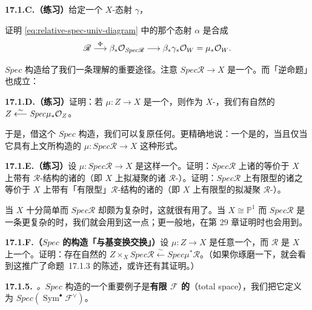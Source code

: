 \textbf{17.1.C.（练习）}\quad 给定一个 $X$-态射 $\gamma$，
证明 \eqref{eq:relative-spec-univ-diagram} 中的那个态射 $\alpha$ 是合成
\[
\mathscr{R}\overset{\Phi}{\longrightarrow}\beta_*\mathcal{O}_{\mathit{Spec}\mathscr{R}}\longrightarrow\beta_*\gamma_*\mathcal{O}_W=\mu_*\mathcal{O}_W.
\]

$\mathit{Spec}$ 构造给了我们一条理解\trAffine\trMorphism{}的重要途径。注意 $\mathit{Spec}\mathscr{R}\to X$ 是一个\trAffine\trMorphism。而「逆命题」也成立：

\textbf{17.1.D.（练习）}\quad 证明：若 $\mu\colon Z\to X$ 是一个\trAffine\trMorphism，则作为 $X$-\trScheme，我们有自然的\trIsomorphism{} $Z\overset{\sim}{\longleftarrow}\mathit{Spec}\mu_*\mathcal{O}_Z$。

于是，借这个 $\mathit{Spec}$ 构造，我们可以复原任何\trAffine\trMorphism。更精确地说：一个\trMorphism{}是\trAffine{}的，当且仅当它具有上文所构造的 $\mu\colon\mathit{Spec}\mathscr{R}\to X$ 这种形式。

\textbf{17.1.E.（练习）}\quad 设 $\mu\colon\mathit{Spec}\mathscr{R}\to X$ 是这样一个\trMorphism。证明：$\mathit{Spec}\mathscr{R}$ 上诸\trQCSheaf{}的\trCategory{}等价于 $X$ 上带有 $\mathscr{R}$-\trModule{}结构的诸\trQCSheaf{}的\trCategory（即 $X$ 上拟凝聚的诸 $\mathscr{R}$-\trModule）。证明：$\mathit{Spec}\mathscr{R}$ 上有限型的诸\trQCSheaf{}之\trCategory{}等价于 $X$ 上带有「有限型」$\mathscr{R}$-\trModule{}结构的诸\trQCSheaf{}的\trCategory（即 $X$ 上有限型的拟凝聚 $\mathscr{R}$-\trModule）。

当 $X$ 十分简单而 $\mathit{Spec}\mathscr{R}$ 却颇为复杂时，这就很有用了。当 $X\cong\mathbb{P}^1$ 而 $\mathit{Spec}\mathscr{R}$ 是一条更复杂的\trCurve{}时，我们就会用到这一点；更一般地，在第 29 章证明\trSerreDuality{}时也会用到。

\textbf{17.1.F.（$\mathit{Spec}$ 的构造「与基变换交换」）}\quad 设 $\mu\colon Z\to X$ 是任意一个\trMorphism，而 $\mathscr{R}$ 是 $X$ 上一个\trQC{}\trSheafOfAlgebras。证明：存在自然的\trIsomorphism{} $Z\times_X\mathit{Spec}\mathscr{R}\overset{\sim}{\longleftarrow}\mathit{Spec}\mu^*\mathscr{R}$。（如果你琢磨一下，就会看到这推广了\mbox{命题~17.1.3} 的陈述，或许还有其证明。）

\textbf{17.1.5.}\ \emph{\trhDefinition{}。}\quad $\mathit{Spec}$ 构造的一个重要例子是\textbf{有限\trRank{}\trLocallyFreeSheaf{} $\mathscr{F}$ 的\trTotalSpace}（total space），我们把它定义为 $\mathit{Spec}(\operatorname{Sym}^\bullet\mathscr{F}^{\vee})$。

